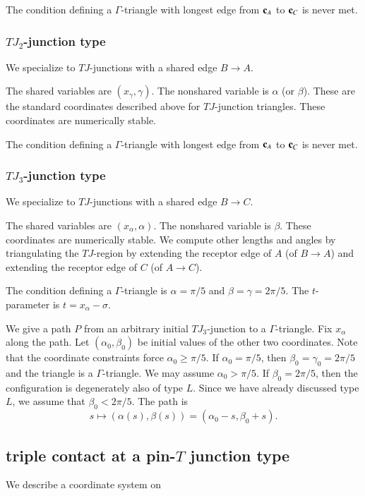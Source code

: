 The condition defining a $\Gamma$-triangle with longest edge from
${\mathbf c}_A$ to ${\mathbf c}_C$ is never met.

\subsubsection{$TJ_2$-junction type}

We specialize to $TJ$-junctions with a shared edge $B\to A$.

The shared variables are $(x_\gamma,\gamma)$.  The nonshared variable
is $\alpha$ (or $\beta$).  These are the standard coordinates
described above for $TJ$-junction triangles.  These coordinates are
numerically stable.

The condition defining a $\Gamma$-triangle with longest edge from
${\mathbf c}_A$ to ${\mathbf c}_C$ is never met.

\subsubsection{$TJ_3$-junction type}

We specialize to $TJ$-junctions with a shared edge $B\to C$.

The shared variables are $(x_\alpha,\alpha)$.  The nonshared variable
is $\beta$.  These coordinates are numerically stable.  We compute
other lengths and angles by triangulating the $TJ$-region by extending
the receptor edge of $A$ (of $B\to A$) and extending the receptor edge
of $C$ (of $A\to C$).

The condition defining a $\Gamma$-triangle is $\alpha=\pi/5$ and
$\beta=\gamma=2\pi/5$.  The $t$-parameter is $t =x_\alpha - \sigma$.

We give a path $P$ from an arbitrary initial $TJ_3$-junction to a
$\Gamma$-triangle.  Fix $x_\alpha$ along the path.  Let
$(\alpha_0,\beta_0)$ be initial values of the other two coordinates.
Note that the coordinate constraints force $\alpha_0\ge \pi/5$. If
$\alpha_0=\pi/5$, then $\beta_0=\gamma_0=2\pi/5$ and the triangle is a
$\Gamma$-triangle.  We may assume $\alpha_0 > \pi/5$.  If
$\beta_0=2\pi/5$, then the configuration is degenerately also of type
$L$.  Since we have already discussed type $L$, we assume that
$\beta_0<2\pi/5$.  The path is
\[
s\mapsto (\alpha(s),\beta(s)) = (\alpha_0 - s,\beta_0+s).
\]


\subsection{triple contact at a pin-$T$ junction type} We describe a coordinate system on

